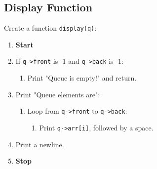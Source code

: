 {  \subsection{Display Function}
  Create a function \texttt{display(q)}:
  \begin{enumerate}[label=\arabic*:,left=0pt]
    \item \textbf{Start}
    \item If \texttt{q->front} is -1 and \texttt{q->back} is -1:
          \begin{enumerate}[label=2.\arabic*.]
            \item Print "Queue is empty!" and return.
          \end{enumerate}
    \item Print "Queue elements are":
          \begin{enumerate}[label=2.\arabic*.]
            \item Loop from \texttt{q->front} to \texttt{q->back}:
                  \begin{enumerate}[label=2.1.\arabic*.]
                    \item Print \texttt{q->arr[i]}, followed by a space.
                  \end{enumerate}
          \end{enumerate}
    \item Print a newline.
    \item \textbf{Stop}
  \end{enumerate}

}
